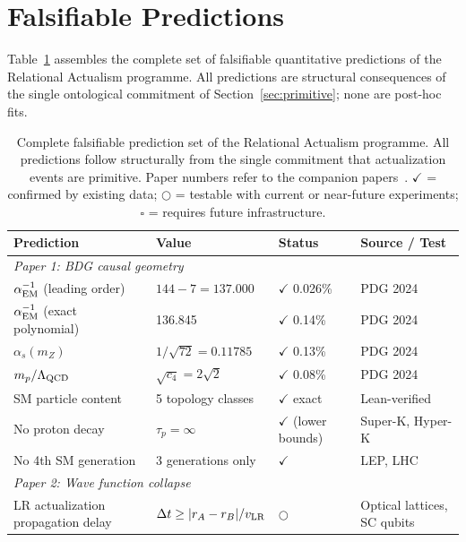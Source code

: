 \documentclass[11pt,twocolumn]{article}
\theoremstyle{plain}
\theoremstyle{remark}
\begin{document}
\section{Falsifiable Predictions}
\label{sec:predictions}

Table~\ref{tab:all_predictions} assembles the complete set of
falsifiable quantitative predictions of the Relational Actualism
programme.
All predictions are structural consequences of the single ontological
commitment of Section~\ref{sec:primitive}; none are post-hoc fits.

\begin{table}[t]
\centering
\caption{Complete falsifiable prediction set of the Relational Actualism
  programme. All predictions follow structurally from the single commitment
  that actualization events are primitive. Paper numbers refer to the
  companion papers~\cite{Sandeman2026P1,Sandeman2026P2,Sandeman2026P3}.
  $\checkmark$ = confirmed by existing data; $\bigcirc$ = testable with
  current or near-future experiments; $\square$ = requires future
  infrastructure.}
\label{tab:all_predictions}
\small
\begin{tabular}{p{4.5cm}p{3.5cm}lp{3cm}}
\toprule
Prediction & Value & Status & Source / Test \\
\midrule
\multicolumn{4}{l}{\textit{Paper 1: BDG causal geometry}} \\[2pt]
$\alpha_{\rm EM}^{-1}$ (leading order) & $144 - 7 = 137.000$ & $\checkmark$ 0.026\% & PDG 2024 \\
$\alpha_{\rm EM}^{-1}$ (exact polynomial) & 136.845 & $\checkmark$ 0.14\% & PDG 2024 \\
$\alpha_s(m_Z)$ & $1/\sqrt{72} = 0.11785$ & $\checkmark$ 0.13\% & PDG 2024 \\
$m_p / \Lambda_{\rm QCD}$ & $\sqrt{c_4} = 2\sqrt{2}$ & $\checkmark$ 0.08\% & PDG 2024 \\
SM particle content & 5 topology classes & $\checkmark$ exact & Lean-verified \\
No proton decay & $\tau_p = \infty$ & $\checkmark$ (lower bounds) & Super-K, Hyper-K \\
No 4th SM generation & 3 generations only & $\checkmark$ & LEP, LHC \\
\midrule
\multicolumn{4}{l}{\textit{Paper 2: Wave function collapse}} \\[2pt]
LR actualization propagation delay & $\Delta t \geq |r_A - r_B|/v_{\rm LR}$ & $\bigcirc$ & Optical lattices, SC qubits \\

\end{tabular}
\end{table}
\end{document}
